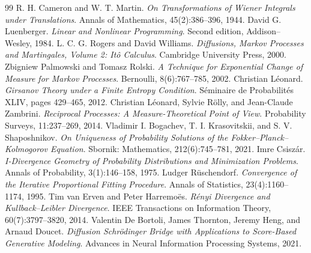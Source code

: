 \begin{thebibliography}{99}
 R. H. Cameron and W. T. Martin. \emph{On Transformations of Wiener Integrals under Translations}. Annals of Mathematics, 45(2):386--396, 1944.
 David G. Luenberger. \emph{Linear and Nonlinear Programming}. Second edition, Addison--Wesley, 1984.
 L. C. G. Rogers and David Williams. \emph{Diffusions, Markov Processes and Martingales, Volume 2: It\^o Calculus}. Cambridge University Press, 2000.
 Zbigniew Palmowski and Tomasz Rolski. \emph{A Technique for Exponential Change of Measure for Markov Processes}. Bernoulli, 8(6):767--785, 2002.
 Christian L\'eonard. \emph{Girsanov Theory under a Finite Entropy Condition}. S\'eminaire de Probabilit\'es XLIV, pages 429--465, 2012.
 Christian L\'eonard, Sylvie R\"olly, and Jean-Claude Zambrini. \emph{Reciprocal Processes: A Measure-Theoretical Point of View}. Probability Surveys, 11:237--269, 2014.
 Vladimir I. Bogachev, T. I. Krasovitskii, and S. V. Shaposhnikov. \emph{On Uniqueness of Probability Solutions of the Fokker--Planck--Kolmogorov Equation}. Sbornik: Mathematics, 212(6):745--781, 2021.
 Imre Csisz\'ar. \emph{I-Divergence Geometry of Probability Distributions and Minimization Problems}. Annals of Probability, 3(1):146--158, 1975.
 Ludger R\"uschendorf. \emph{Convergence of the Iterative Proportional Fitting Procedure}. Annals of Statistics, 23(4):1160--1174, 1995.
 Tim van Erven and Peter Harremo\"es. \emph{R\'enyi Divergence and Kullback--Leibler Divergence}. IEEE Transactions on Information Theory, 60(7):3797--3820, 2014.
 Valentin De Bortoli, James Thornton, Jeremy Heng, and Arnaud Doucet. \emph{Diffusion Schr\"odinger Bridge with Applications to Score-Based Generative Modeling}. Advances in Neural Information Processing Systems, 2021.


\end{thebibliography}

